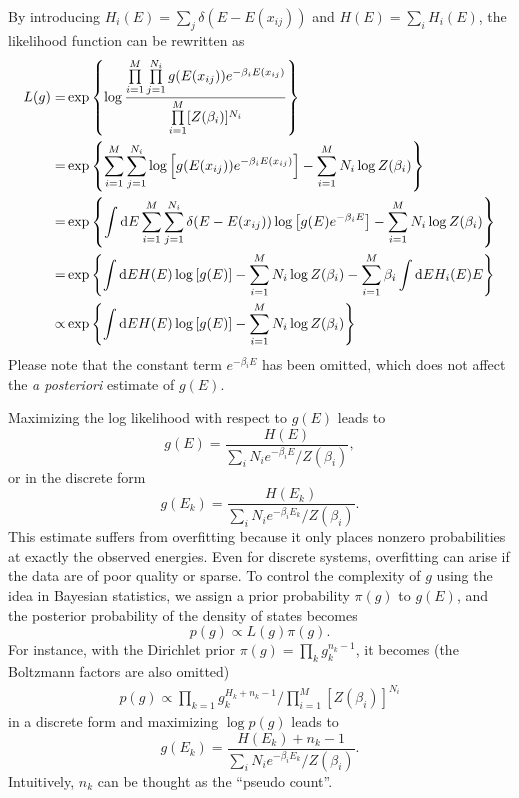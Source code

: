 By introducing $H_i(E)=\sum_{j}\delta(E-E(x_{ij}))$ and $H(E)=\sum_iH_i(E)$, the likelihood function can be rewritten as
\begin{align}
    L(g)=&\exp{\left\{\log\frac{\prod\limits_{i=1}^{M}\prod\limits_{j=1}^{N_i}g(E(x_{ij}))e^{-\beta_{i}E(x_{ij})}}{\prod\limits_{i=1}^{M}[Z(\beta_i)]^{N_i}}\right\}}\notag\\
        =&\exp{\left\{\sum\limits_{i=1}^{M}\sum\limits_{j=1}^{N_i}\log \left[g(E(x_{ij}))e^{-\beta_{i}E(x_{ij})}\right]-\sum\limits_{i=1}^{M}N_i\log Z(\beta_i)\right\}}\notag\\
        =&\exp{\left\{\int\mathop{}\!\mathrm{d}E \sum\limits_{i=1}^{M}\sum\limits_{j=1}^{N_i}\delta(E-E(x_{ij}))\log \left[g(E)e^{-\beta_{i}E}\right]-\sum\limits_{i=1}^{M}N_i\log Z(\beta_i)\right\}}\notag\\
        =&\exp{\left\{\int\mathop{}\!\mathrm{d}E H(E)\log \left[g(E)\right]-\sum\limits_{i=1}^{M}N_i\log Z(\beta_i)-\sum\limits_{i=1}^M\beta_i\int \mathop{}\!\mathrm{d}E H_i(E)E\right\}}\notag\\
        \propto& \exp{\left\{\int\mathop{}\!\mathrm{d}E H(E)\log \left[g(E)\right]-\sum\limits_{i=1}^{M}N_i\log Z(\beta_i)\right\}}
\end{align} 
Please note that the constant term $e^{-\beta_iE}$ has been omitted, which does not affect the \textit{a posteriori} estimate of $g(E)$.

Maximizing the log likelihood with respect to $g(E)$ leads to
\begin{equation}
    g(E)=\frac{H(E)}{\sum_i N_ie^{-\beta_iE}/Z(\beta_i)},
\end{equation}
or in the discrete form
\begin{equation}
    g(E_k)=\frac{H(E_k)}{\sum_i N_ie^{-\beta_iE_k}/Z(\beta_i)}.
\end{equation}
This estimate suffers from overfitting because it only places nonzero probabilities at exactly the observed energies. Even for discrete systems, overfitting can arise if the data are of poor quality or sparse. To control the complexity of $g$ using the idea in Bayesian statistics, we assign a prior probability $\pi(g)$ to $g(E)$, and the posterior probability of the density of states becomes
\begin{equation}
    p(g)\propto L(g)\pi(g).
\end{equation}
For instance, with the Dirichlet prior $\pi(g)=\prod_kg_k^{n_k-1}$, it becomes (the Boltzmann factors are also omitted)
\begin{align}
    p(g)\propto \prod_{k=1}g_k^{H_k+n_k-1}/\prod_{i=1}^{M}[Z(\beta_i)]^{N_i}
    \label{Eq:FEM:WHAM:ProbDoSDirichlet}
\end{align}
in a discrete form and maximizing $\log p(g)$ leads to
\begin{equation}
    g(E_k)=\frac{H(E_k)+n_k-1}{\sum_i N_ie^{-\beta_iE_k}/Z(\beta_i)}.
\end{equation}
Intuitively, $n_k$ can be thought as the ``pseudo count''.

